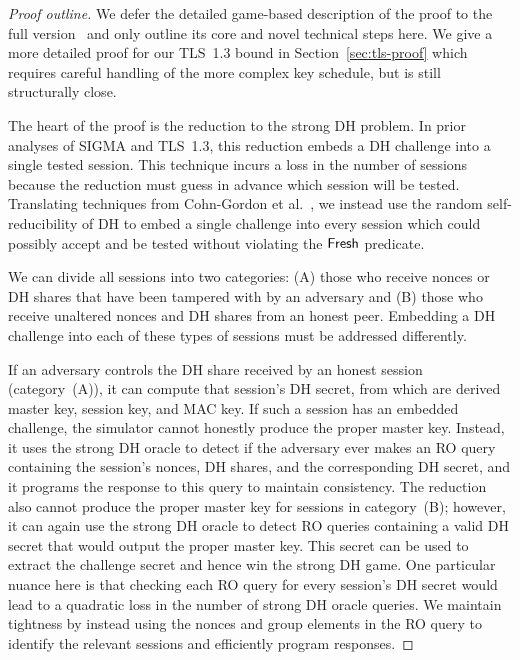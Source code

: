 \else


\begin{proof}[Proof outline]
We defer the detailed game-based description of the proof to the full version~\cite{EPRINT:DavGun20} and only outline its core and novel technical steps here.
We give a more detailed proof for our TLS~1.3 bound in Section~\ref{sec:tls-proof} which requires careful handling of the more complex key schedule, but is still structurally close.

The heart of the proof is the reduction to the strong DH problem.
In prior analyses of SIGMA and TLS~1.3, this reduction embeds a DH challenge into a single tested session.
This technique incurs a loss in the number of sessions because the reduction must guess in advance which session will be tested.
Translating techniques from Cohn-Gordon et al.~\cite{C:CCGJJ19}, we instead use the random self-reducibility of DH to embed a single challenge into every session which could possibly accept and be tested without violating the $\mathsf{Fresh}$ predicate.

We can divide all sessions into two categories:
(A) those who receive nonces or DH shares that have been tampered with by an adversary and
(B) those who receive unaltered nonces and DH shares from an honest peer.
Embedding a DH challenge into each of these types of sessions must be addressed differently.

If an adversary controls the DH share received by an honest session (category~(A)), it can compute that session's DH secret, from which are derived master key, session key, and MAC key.
If such a session has an embedded challenge, the simulator cannot honestly produce the proper master key.
Instead, it uses the strong DH oracle to detect if the adversary ever makes an RO query containing the session's nonces, DH shares, and the corresponding DH secret, and it programs the response to this query to maintain consistency.
The reduction also cannot produce the proper master key for sessions in category~(B); however, it can again use the strong DH oracle to detect RO queries containing a valid DH secret that would output the proper master key.
This secret can be used to extract the challenge secret and hence win the strong DH game.
One particular nuance here is that checking each RO query for every session's DH secret would lead to a quadratic loss in the number of strong DH oracle queries.
We maintain tightness by instead using the nonces and group elements in the RO query to identify the relevant sessions and efficiently program responses.


\end{proof}
